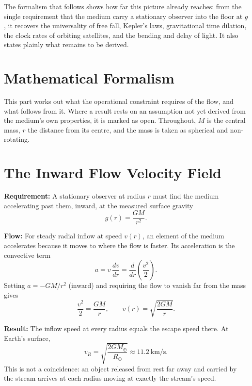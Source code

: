 \documentclass[11pt,a4paper]{article}
\begin{document}
The formalism that follows shows how far this picture already reaches: from the single requirement that the medium carry a stationary observer into the floor at $g$, it recovers the universality of free fall, Kepler's laws, gravitational time dilation, the clock rates of orbiting satellites, and the bending and delay of light. It also states plainly what remains to be derived.

\newpage

\section*{Mathematical Formalism}
This part works out what the operational constraint requires of the flow, and what follows from it. Where a result rests on an assumption not yet derived from the medium's own properties, it is marked as open. Throughout, $M$ is the central mass, $r$ the distance from its centre, and the mass is taken as spherical and non-rotating.

\section{The Inward Flow Velocity Field}
\label{sec:flow}
\textbf{Requirement:} A stationary observer at radius $r$ must find the medium accelerating past them, inward, at the measured surface gravity
\begin{equation}
g(r) = \frac{GM}{r^2}.
\end{equation}

\textbf{Flow:} For steady radial inflow at speed $v(r)$, an element of the medium accelerates because it moves to where the flow is faster. Its acceleration is the convective term
\begin{equation}
a = v\,\frac{dv}{dr} = \frac{d}{dr}\!\left(\frac{v^2}{2}\right).
\end{equation}
Setting $a = -GM/r^2$ (inward) and requiring the flow to vanish far from the mass gives
\begin{equation}
\frac{v^2}{2} = \frac{GM}{r}, \qquad v(r) = \sqrt{\frac{2GM}{r}}.
\end{equation}

\textbf{Result:} The inflow speed at every radius equals the escape speed there. At Earth's surface,
\begin{equation}
v_R = \sqrt{\frac{2GM_\oplus}{R_\oplus}} \approx 11.2\ \text{km/s}.
\end{equation}
This is not a coincidence: an object released from rest far away and carried by the stream arrives at each radius moving at exactly the stream's speed.
\end{document}
